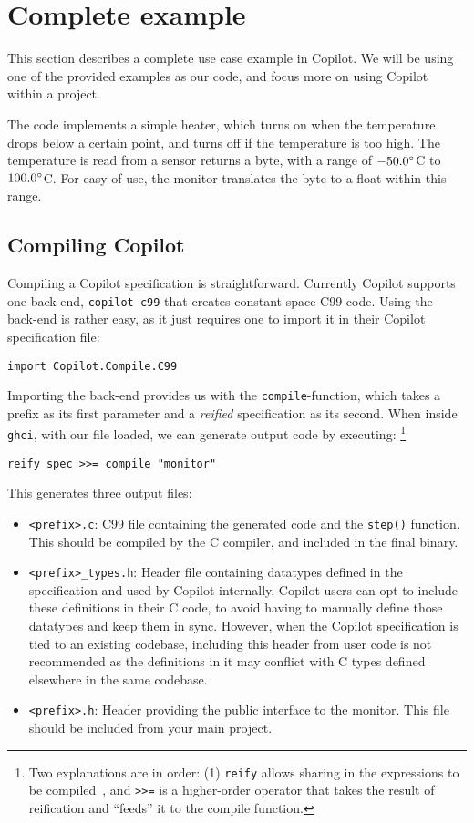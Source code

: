 \section{Complete example}
\label{sec:complete_example}
This section describes a complete use case example in Copilot. We will be using
one of the provided examples as our code, and focus more on using Copilot
within a project.

The code implements a simple heater, which turns on when the temperature drops
below a certain point, and turns off if the temperature is too high. The
temperature is read from a sensor returns a byte, with a range of
$-50.0\degree$C to $100.0\degree$C. For easy of use, the monitor translates the
byte to a float within this range.

\subsection{Compiling Copilot} \label{sec:compiling}

Compiling a Copilot specification is straightforward. Currently Copilot
supports one back-end, \texttt{copilot-c99} that creates constant-space C99
code. Using the back-end is rather easy, as it just requires one to import it in
their Copilot specification file:

\begin{lstlisting}[language = Copilot]
import Copilot.Compile.C99
\end{lstlisting}

Importing the back-end provides us with the \texttt{compile}-function, which
takes a prefix as its first parameter and a \textit{reified} specification as
its second. When inside \texttt{ghci}, with our file loaded, we can generate
output code by executing:
\footnote{Two explanations are in order: (1) {\tt reify} allows sharing in the
expressions to be compiled~\cite{DSLExtract}, and {\tt >>=} is a higher-order
operator that takes the result of reification and ``feeds'' it to the compile
function.}
\begin{lstlisting}[language = Copilot]
reify spec >>= compile "monitor"
\end{lstlisting}

This generates three output files:
\begin{itemize}
  \item \texttt{<prefix>.c}: C99 file containing the generated code and the
  \texttt{step()} function. This should be compiled by the C compiler, and
  included in the final binary.
  \item \texttt{<prefix>\_types.h}: Header file containing datatypes defined in the specification and used by Copilot internally. Copilot users can opt to include these definitions in their C code, to avoid having to manually define those datatypes and keep them in sync. However, when the Copilot specification is tied to an existing codebase, including this header from user code is not recommended as the definitions in it may conflict with C types defined elsewhere in the same codebase.
 \item \texttt{<prefix>.h}: Header providing the public interface to the
  monitor. This file should be included from your main project.
\end{itemize}

